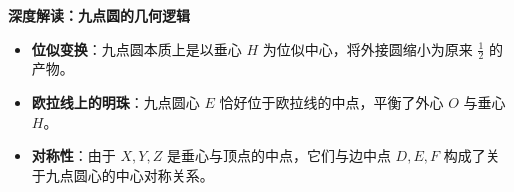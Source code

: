 \begin{explanationbox}
\textbf{深度解读：九点圆的几何逻辑}
\begin{itemize}
    \item \textbf{位似变换}：九点圆本质上是以垂心 $H$ 为位似中心，将外接圆缩小为原来 $\frac{1}{2}$ 的产物。
    \item \textbf{欧拉线上的明珠}：九点圆心 $E$ 恰好位于欧拉线的中点，平衡了外心 $O$ 与垂心 $H$。
    \item \textbf{对称性}：由于 $X, Y, Z$ 是垂心与顶点的中点，它们与边中点 $D, E, F$ 构成了关于九点圆心的中心对称关系。
\end{itemize}
\end{explanationbox}